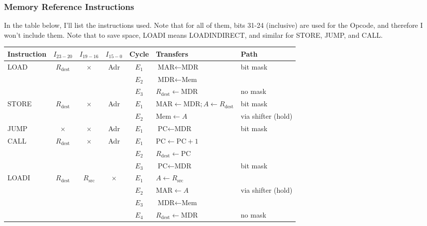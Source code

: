 \documentclass[a4paper, 12pt]{article}
\begin{document}
            \subsubsection*{Memory Reference Instructions}
            In the table below, I'll list the instructions used. Note that for all of them, bits 31-24 (inclusive) are used for the Opcode, and therefore I won't include them. Note that to save space, LOADI means LOADINDIRECT, and similar for STORE, JUMP, and CALL.
            \begin{center}
                \begin{tabular}{l||c|c|c||c|l|l}
                    Instruction & $I_{23-20}$ & $I_{19-16}$ & $I_{15-0}$ & Cycle & Transfers & Path \\
                    \hline
                    LOAD & $R_\text{dest}$ & $\times$ & Adr & $E_1$ & $\text{MAR} \leftarrow \text{MDR}$ & bit mask \\
                    & & & & $E_2$ & $\text{MDR} \leftarrow \text{Mem}$ & \\
                    & & & & $E_3$ & $R_\text{dest} \leftarrow \text{MDR}$ & no mask \\
                    \hline
                    STORE & $R_\text{dest}$ & $\times$ & Adr & $E_1$ & $\text{MAR} \leftarrow \text{MDR}; A \leftarrow R_\text{dest}$ & bit mask \\
                    & & & & $E_2$ & $\text{Mem} \leftarrow A$ & via shifter (hold) \\
                    \hline
                    JUMP & $\times$ & $\times$ & Adr & $E_1$ & $\text{PC} \leftarrow \text{MDR}$ & bit mask \\
                    \hline
                    CALL & $R_\text{dest}$ & $\times$ & Adr & $E_1$ & $\text{PC} \leftarrow \text{PC} + 1$ & \\
                    & & & & $E_2$ & $R_\text{dest} \leftarrow \text{PC}$ & \\
                    & & & & $E_3$ & $\text{PC} \leftarrow \text{MDR}$ & bit mask \\
                    \hline
                    LOADI & $R_\text{dest}$ & $R_\text{src}$ & $\times$ & $E_1$ & $A \leftarrow R_\text{src}$ & \\
                    & & & & $E_2$ & $\text{MAR} \leftarrow A$ & via shifter (hold) \\
                    & & & & $E_3$ & $\text{MDR} \leftarrow \text{Mem}$ & \\
                    & & & & $E_4$ & $R_\text{dest} \leftarrow \text{MDR}$ & no mask \\

\end{tabular}
\end{center}
\end{document}
